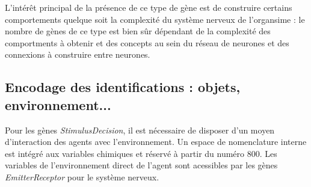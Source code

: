\documentclass[11pt,twoside,a4paper]{article}
\begin{document}
L'int{\'e}r{\^e}t principal de la pr{\'e}sence de ce type de g{\`e}ne est de construire certains comportements quelque soit la complexit{\'e} du syst{\`e}me nerveux de l'organsime : le nombre de g{\`e}nes de ce type est bien s{\^u}r d{\'e}pendant de la complexit{\'e} des comportments {\`a} obtenir et des concepts au sein du r{\'e}seau de neurones et des connexions {\`a} construire entre neurones. 

\clearpage

\subsection{Encodage des identifications : objets, environnement...}

Pour les g{\`e}nes \emph{StimulusDecision}, il est n{\'e}cessaire de disposer d'un moyen d'interaction des agents avec l'environnement.  Un espace de nomenclature interne est int{\'e}gr{\'e} aux variables chimiques et r{\'e}serv{\'e} {\`a} partir du num{\'e}ro 800. Les variables de l'environnement direct de l'agent sont acessibles par les g{\`e}nes \emph{EmitterReceptor} pour le syst{\`e}me nerveux.
\end{document}
